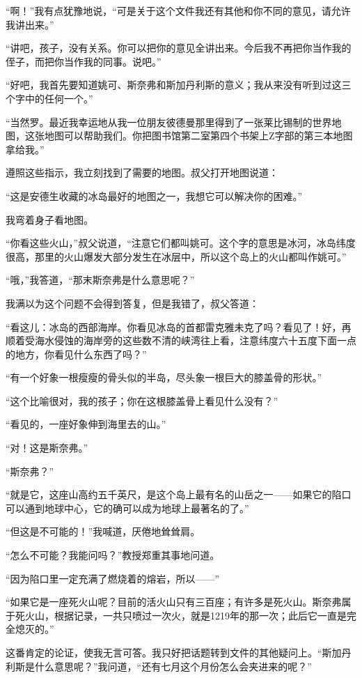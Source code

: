 \documentclass[10pt]{book}
\begin{document}
“啊！”我有点犹豫地说，“可是关于这个文件我还有其他和你不同的意见，请允许我讲出来。”

“讲吧，孩子，没有关系。你可以把你的意见全讲出来。今后我不再把你当作我的侄子，而把你当作我的同事。说吧。”

“好吧，我首先要知道姚可、斯奈弗和斯加丹利斯的意义；我从来没有听到过这三个字中的任何一个。”

“当然罗。最近我幸运地从我一位朋友彼德曼那里得到了一张莱比锡制的世界地图，这张地图可以帮助我们。你把图书馆第二室第四个书架上Z字部的第三本地图拿给我。”

遵照这些指示，我立刻找到了需要的地图。叔父打开地图说道：

“这是安德生收藏的冰岛最好的地图之一，我想它可以解决你的困难。”

我弯着身子看地图。

“你看这些火山，”叔父说道，“注意它们都叫姚可。这个字的意思是冰河，冰岛纬度很高，那里的火山爆发大部分发生在冰层中，所以这个岛上的火山都叫作姚可。”

“哦，”我答道，“那末斯奈弗是什么意思呢？”

我满以为这个问题不会得到答复，但是我错了，叔父答道：

“看这儿：冰岛的西部海岸。你看见冰岛的首都雷克雅未克了吗？看见了！好，再顺着受海水侵蚀的海岸旁的这些数不清的峡湾往上看，注意纬度六十五度下面一点的地方，你看见什么东西了吗？”

“有一个好象一根瘦瘦的骨头似的半岛，尽头象一根巨大的膝盖骨的形状。”

“这个比喻很对，我的孩子；你在这根膝盖骨上看见什么没有？”

“看见的，一座好象伸到海里去的山。”

“对！这是斯奈弗。”

“斯奈弗？”

“就是它，这座山高约五千英尺，是这个岛上最有名的山岳之一——如果它的陷口可以通到地球中心，它的确可以成为地球上最著名的了。”

“但这是不可能的！”我喊道，厌倦地耸耸肩。

“怎么不可能？我能问吗？”教授郑重其事地问道。

“因为陷口里一定充满了燃烧着的熔岩，所以——”

“如果它是一座死火山呢？目前的活火山只有三百座；有许多是死火山。斯奈弗属于死火山，根据记录，一共只喷过一次火，就是1219年的那一次；此后它一直是完全熄灭的。”

这番肯定的论证，使我无言可答。我只好把话题转到文件的其他疑问上。“斯加丹利斯是什么意思呢？”我问道，“还有七月这个月份怎么会夹进来的呢？”
\end{document}
